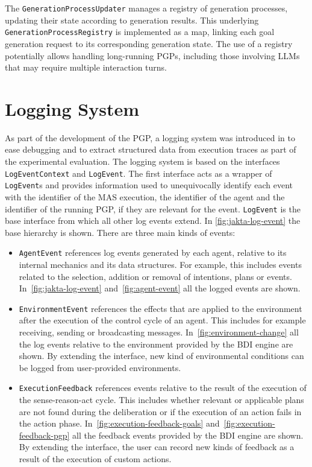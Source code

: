 \documentclass[12pt,a4paper,openright,twoside]{book}
\begin{document}
The \texttt{GenerationProcessUpdater} manages a registry of generation processes, updating their state according to generation results.
%
This underlying \\ \texttt{GenerationProcessRegistry} is implemented as a map, linking each goal generation request to its corresponding generation state.
%
The use of a registry potentially allows handling long-running \acp{PGP}, including those involving \acp{LLM} that may require multiple interaction turns.

\section{Logging System}\label{sec:logging-system}

As part of the development of the \ac{PGP}, a logging system was introduced in \jakta{} to ease debugging and to extract structured data from execution traces as part of the experimental evaluation.
%
The logging system is based on the interfaces \texttt{LogEventContext} and \texttt{LogEvent}.
%
The first interface acts as a wrapper of \texttt{LogEvent}s and provides information used to unequivocally identify each event with the identifier of the \ac{MAS} execution, the identifier of the agent and the identifier of the running \ac{PGP}, if they are relevant for the event.
%
\texttt{LogEvent} is the base interface from which all other log events extend. In \cref{fig:jakta-log-event} the base hierarchy is shown. There are three main kinds of events:

\begin{itemize}
    \item \texttt{AgentEvent} references log events generated by each agent, relative to its internal mechanics and its data structures. 
    For example, this includes events related to the selection, addition or removal of intentions, plans or events. In~\cref{fig:jakta-log-event} and~\cref{fig:agent-event} all the logged events are shown.
    \item \texttt{EnvironmentEvent} references the effects that are applied to the environment after the execution of the control cycle of an agent.
    This includes for example receiving, sending or broadcasting messages. 
    In~\cref{fig:environment-change} all the log events relative to the environment provided by the BDI engine are shown. 
    By extending the interface, new kind of environmental conditions can be logged from user-provided environments.
    \item \texttt{ExecutionFeedback} references events relative to the result of the execution of the sense-reason-act cycle. 
    This includes whether relevant or applicable plans are not found during the deliberation or if the execution of an action fails in the action phase. 
    In~\cref{fig:execution-feedback-goals} and~\cref{fig:execution-feedback-pgp} all the feedback events provided by the BDI engine are shown. 
    By extending the interface, the user can record new kinds of feedback as a result of the execution of custom actions.
\end{itemize}
\end{document}

